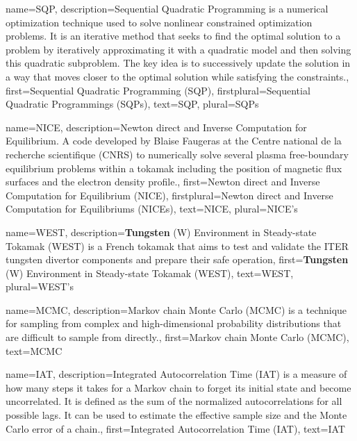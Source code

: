 {%
  name={SQP},%
  description={Sequential Quadratic Programming is a numerical optimization technique used to solve nonlinear constrained optimization problems. It is an iterative method that seeks to find the optimal solution to a problem by iteratively approximating it with a quadratic model and then solving this quadratic subproblem. The key idea is to successively update the solution in a way that moves closer to the optimal solution while satisfying the constraints.},%
  first={Sequential Quadratic Programming (SQP)},%
  firstplural={Sequential Quadratic Programmings (SQPs)},%
  text={SQP},%
  plural={SQPs}%
}


{%
  name={NICE},%
  description={Newton direct and Inverse Computation for Equilibrium. A code developed by Blaise Faugeras at the Centre national de la recherche scientifique (CNRS) to numerically solve several plasma free-boundary equilibrium problems within a tokamak including the position of magnetic flux surfaces and the electron density profile.},%
  first={Newton direct and Inverse Computation for Equilibrium (NICE)},%
  firstplural={Newton direct and Inverse Computation for Equilibriums (NICEs)},%
  text={NICE},%
  plural={NICE's}%
}

{%
  name={WEST},%
  description={\textbf{Tungsten} (W) Environment in Steady-state Tokamak (WEST) is a French tokamak that aims to test and validate the ITER tungsten divertor components and prepare their safe operation},%
  first={\textbf{Tungsten} (W) Environment in Steady-state Tokamak (WEST)},%
  text={WEST},%
  plural={WEST's}%
}

{%
  name={MCMC},%
  description={Markov chain Monte Carlo (MCMC) is a technique for sampling from complex and high-dimensional probability distributions that are difficult to sample from directly.},%
  first={Markov chain Monte Carlo (MCMC)},%
  text={MCMC}%
}

{%
  name={IAT},%
  description={Integrated Autocorrelation Time (IAT) is a measure of how many steps it takes for a Markov chain to forget its initial state and become uncorrelated. It is defined as the sum of the normalized autocorrelations for all possible lags. It can be used to estimate the effective sample size and the Monte Carlo error of a chain.},%
  first={Integrated Autocorrelation Time (IAT)},%
  text={IAT}%
}

